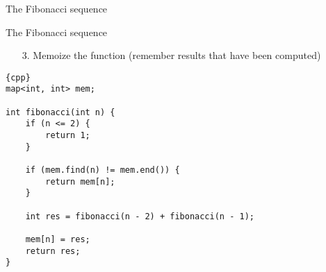 \begin{frame}[fragile]{The Fibonacci sequence}
\begin{figure}
% 
            \end{figure}

\end{frame}

\begin{frame}[fragile]{The Fibonacci sequence}
    \begin{itemize}
        \item[3.] Memoize the function (remember results that have been computed)
    \end{itemize}

    \begin{lstlisting}[basicstyle=\footnotesize]{cpp}
map<int, int> mem;

int fibonacci(int n) {
    if (n <= 2) {
        return 1;
    }

    if (mem.find(n) != mem.end()) {
        return mem[n];
    }

    int res = fibonacci(n - 2) + fibonacci(n - 1);

    mem[n] = res;
    return res;
}
    \end{lstlisting}

\end{frame}

